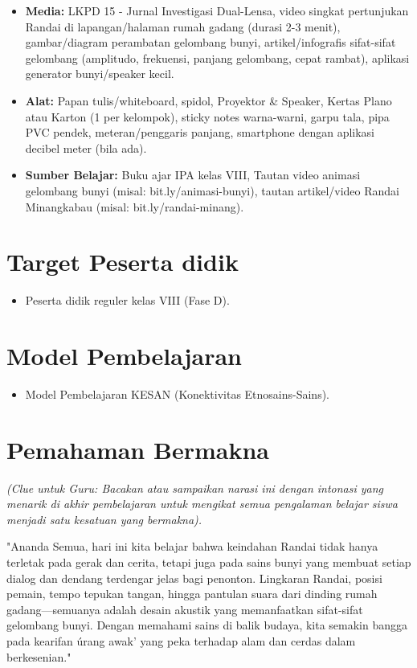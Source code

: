 \documentclass[12pt,a4paper]{article}
\begin{document}
\begin{itemize}
\item \textbf{Media:} LKPD 15 - Jurnal Investigasi Dual-Lensa, video singkat pertunjukan Randai di lapangan/halaman rumah gadang (durasi 2-3 menit), gambar/diagram perambatan gelombang bunyi, artikel/infografis sifat-sifat gelombang (amplitudo, frekuensi, panjang gelombang, cepat rambat), aplikasi generator bunyi/speaker kecil.
\item \textbf{Alat:} Papan tulis/whiteboard, spidol, Proyektor \& Speaker, Kertas Plano atau Karton (1 per kelompok), sticky notes warna-warni, garpu tala, pipa PVC pendek, meteran/penggaris panjang, smartphone dengan aplikasi decibel meter (bila ada).
\item \textbf{Sumber Belajar:} Buku ajar IPA kelas VIII, Tautan video animasi gelombang bunyi (misal: bit.ly/animasi-bunyi), tautan artikel/video Randai Minangkabau (misal: bit.ly/randai-minang).
\end{itemize}

\section{Target Peserta didik}

\begin{itemize}
\item Peserta didik reguler kelas VIII (Fase D).
\end{itemize}

\section{Model Pembelajaran}

\begin{itemize}
\item Model Pembelajaran KESAN (Konektivitas Etnosains-Sains).
\end{itemize}

\section{Pemahaman Bermakna}
\textit{(Clue untuk Guru: Bacakan atau sampaikan narasi ini dengan intonasi yang menarik di akhir pembelajaran untuk mengikat semua pengalaman belajar siswa menjadi satu kesatuan yang bermakna).}

\begin{tcolorbox}[mystyle]
"Ananda Semua, hari ini kita belajar bahwa keindahan Randai tidak hanya terletak pada gerak dan cerita, tetapi juga pada sains bunyi yang membuat setiap dialog dan dendang terdengar jelas bagi penonton. Lingkaran Randai, posisi pemain, tempo tepukan tangan, hingga pantulan suara dari dinding rumah gadang—semuanya adalah desain akustik yang memanfaatkan sifat-sifat gelombang bunyi. Dengan memahami sains di balik budaya, kita semakin bangga pada kearifan \'urang awak' yang peka terhadap alam dan cerdas dalam berkesenian."
\end{tcolorbox}
\end{document}
